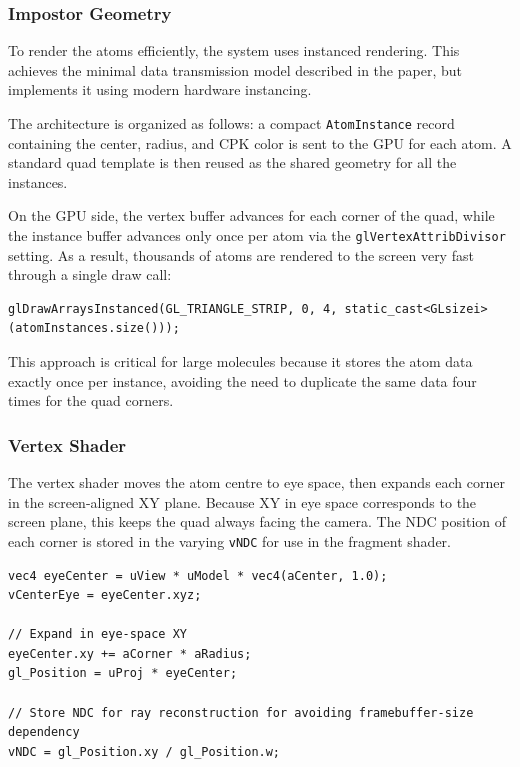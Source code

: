 \documentclass[12pt, a4paper]{article}
\begin{document}
\subsubsection{Impostor Geometry}
To render the atoms efficiently, the system uses instanced rendering. This achieves the minimal data transmission model described in the paper, but implements it using modern hardware instancing.

The architecture is organized as follows: a compact \texttt{AtomInstance} record containing the center, radius, and CPK color is sent to the GPU for each atom. A standard quad template is then reused as the shared geometry for all the instances.

On the GPU side, the vertex buffer advances for each corner of the quad, while the instance buffer advances only once per atom via the \texttt{glVertexAttribDivisor} setting. As a result, thousands of atoms are rendered to the screen very fast through a single draw call:

\begin{lstlisting}[style=cppstyle]
glDrawArraysInstanced(GL_TRIANGLE_STRIP, 0, 4, static_cast<GLsizei>(atomInstances.size()));
\end{lstlisting}

This approach is critical for large molecules because it stores the atom data exactly once per instance, avoiding the need to duplicate the same data four times for the quad corners.

\subsubsection{Vertex Shader}

The vertex shader moves the atom centre to eye space, then expands each corner in the screen-aligned XY plane. Because XY in eye space corresponds to the screen plane, this keeps the quad always facing the camera. The NDC position of each corner is stored in the varying \texttt{vNDC} for use in the fragment shader.

\begin{lstlisting}[style=glslstyle, caption={billboard expansion in eye space (quadric.vert) }]
vec4 eyeCenter = uView * uModel * vec4(aCenter, 1.0);
vCenterEye = eyeCenter.xyz;

// Expand in eye-space XY 
eyeCenter.xy += aCorner * aRadius;
gl_Position = uProj * eyeCenter;

// Store NDC for ray reconstruction for avoiding framebuffer-size dependency
vNDC = gl_Position.xy / gl_Position.w;
\end{lstlisting}
\end{document}
